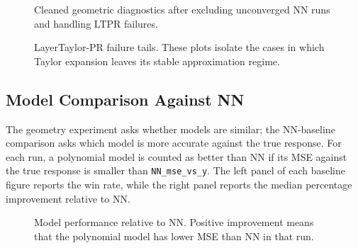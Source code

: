 \documentclass[]{interact}
\theoremstyle{plain}
\theoremstyle{definition}
\theoremstyle{remark}
\begin{document}
\begin{figure}[htbp]
\centering
{}
\hfill
{}

\hfill
{}
\caption{Cleaned geometric diagnostics after excluding unconverged NN runs and
handling LTPR failures.}
\label{fig:cleaned-geometry}
\end{figure}

\begin{figure}[htbp]
\centering
{}
\hfill
{}

\hfill
{}
\caption{LayerTaylor-PR failure tails. These plots isolate the cases in which
Taylor expansion leaves its stable approximation regime.}
\label{fig:ltpr-failure}
\end{figure}

\subsection{Model Comparison Against NN}

The geometry experiment asks whether models are similar; the NN-baseline
comparison asks which model is more accurate against the true response. For each
run, a polynomial model is counted as better than NN if its MSE against the true
response is smaller than \texttt{NN\_mse\_vs\_y}. The left panel of each
baseline figure reports the win rate, while the right panel reports the median
percentage improvement relative to NN.

\begin{figure}[htbp]
\centering
{}
\hfill
{}

\hfill
{}
\caption{Model performance relative to NN. Positive improvement means that the
polynomial model has lower MSE than NN in that run.}
\label{fig:nn-baseline}
\end{figure}
\end{document}
